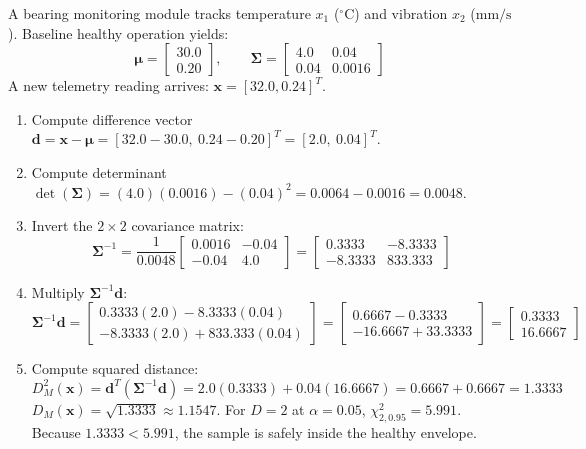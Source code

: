 \begin{example}
A bearing monitoring module tracks temperature $x_1$ ($^\circ\text{C}$) and vibration $x_2$ ($\text{mm/s}$). Baseline healthy operation yields:
\begin{equation*}
\boldsymbol{\mu} = \begin{bmatrix} 30.0 \\ 0.20 \end{bmatrix}, \qquad \mathbf{\Sigma} = \begin{bmatrix} 4.0 & 0.04 \\ 0.04 & 0.0016 \end{bmatrix}
\end{equation*}
A new telemetry reading arrives: $\mathbf{x} = [32.0, 0.24]^T$.
\begin{enumerate}
    \item Compute difference vector $\mathbf{d} = \mathbf{x} - \boldsymbol{\mu} = [32.0 - 30.0, \ 0.24 - 0.20]^T = [2.0, \ 0.04]^T$.
    \item Compute determinant $\det(\mathbf{\Sigma}) = (4.0)(0.0016) - (0.04)^2 = 0.0064 - 0.0016 = 0.0048$.
    \item Invert the $2 \times 2$ covariance matrix:
    \begin{equation*}
    \mathbf{\Sigma}^{-1} = \frac{1}{0.0048} \begin{bmatrix} 0.0016 & -0.04 \\ -0.04 & 4.0 \end{bmatrix} = \begin{bmatrix} 0.3333 & -8.3333 \\ -8.3333 & 833.333 \end{bmatrix}
    \end{equation*}
    \item Multiply $\mathbf{\Sigma}^{-1} \mathbf{d}$:
    \begin{equation*}
    \mathbf{\Sigma}^{-1} \mathbf{d} = \begin{bmatrix} 0.3333(2.0) - 8.3333(0.04) \\ -8.3333(2.0) + 833.333(0.04) \end{bmatrix} = \begin{bmatrix} 0.6667 - 0.3333 \\ -16.6667 + 33.3333 \end{bmatrix} = \begin{bmatrix} 0.3333 \\ 16.6667 \end{bmatrix}
    \end{equation*}
    \item Compute squared distance:
    \begin{equation*}
    D_M^2(\mathbf{x}) = \mathbf{d}^T (\mathbf{\Sigma}^{-1} \mathbf{d}) = 2.0(0.3333) + 0.04(16.6667) = 0.6667 + 0.6667 = \mathbf{1.3333}
    \end{equation*}
    $D_M(\mathbf{x}) = \sqrt{1.3333} \approx 1.1547$. For $D = 2$ at $\alpha = 0.05$, $\chi^2_{2, 0.95} = 5.991$. Because $1.3333 < 5.991$, the sample is safely inside the healthy envelope.
\end{enumerate}
\end{example}

